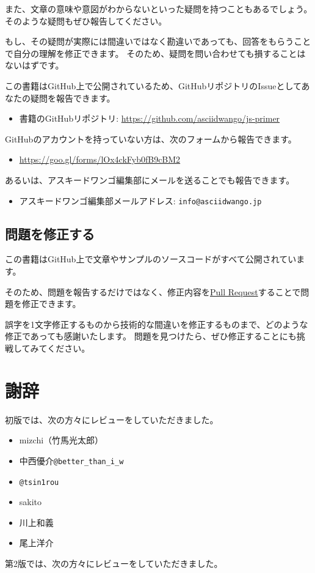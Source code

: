また、文章の意味や意図がわからないといった疑問を持つこともあるでしょう。
そのような疑問もぜひ報告してください。

もし、その疑問が実際には間違いではなく勘違いであっても、回答をもらうことで自分の理解を修正できます。
そのため、疑問を問い合わせても損することはないはずです。

この書籍はGitHub上で公開されているため、GitHubリポジトリのIssueとしてあなたの疑問を報告できます。

\begin{itemize}
\item 書籍のGitHubリポジトリ: \url{https://github.com/asciidwango/js-primer}
\end{itemize}

GitHubのアカウントを持っていない方は、次のフォームから報告できます。
\begin{itemize}
\item \url{https://goo.gl/forms/lOx4ckFyb0fB9cBM2}
\end{itemize}

あるいは、アスキードワンゴ編集部にメールを送ることでも報告できます。
\begin{itemize}
\item アスキードワンゴ編集部メールアドレス: \texttt{info@asciidwango.jp}
\end{itemize}

\hypertarget{pull-request}{%
\subsection*{問題を修正する}\label{pull-request}}

この書籍はGitHub上で文章やサンプルのソースコードがすべて公開されています。

そのため、問題を報告するだけではなく、修正内容を\href{https://help.github.com/articles/about-pull-requests/}{Pull
Request}することで問題を修正できます。

誤字を1文字修正するものから技術的な間違いを修正するものまで、どのような修正であっても感謝いたします。
問題を見つけたら、ぜひ修正することにも挑戦してみてください。

\hypertarget{thanks}{%
\section*{謝辞}\label{thanks}}

初版では、次の方々にレビューをしていただきました。

\begin{itemize}
\item mizchi（竹馬光太郎）
\item 中西優介\texttt{@better\_than\_i\_w}
\item \texttt{@tsin1rou}
\item sakito
\item 川上和義
\item 尾上洋介
\end{itemize}
\newpage
第2版では、次の方々にレビューをしていただきました。

